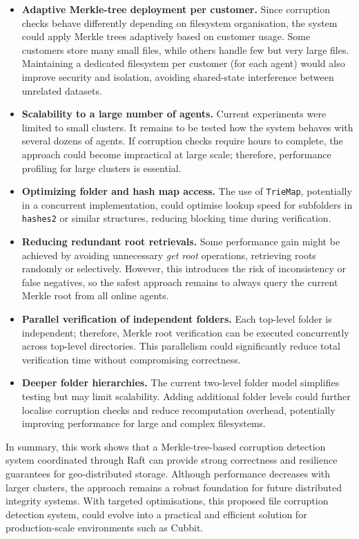 \begin{itemize}
    \item \textbf{Adaptive Merkle-tree deployment per customer.}
    Since corruption checks behave differently depending on filesystem
    organisation, the system could apply Merkle trees adaptively based on customer usage.
    Some customers store many small files, while others handle few but very large files.
    Maintaining a dedicated filesystem per customer (for each agent) would also improve security and isolation, avoiding shared-state interference between unrelated datasets.

    \item \textbf{Scalability to a large number of agents.}
    Current experiments were limited to small clusters.
    It remains to be tested how the system behaves with several dozens of agents.
    If corruption checks require hours to complete, the approach could become impractical at large scale; therefore, performance profiling for large clusters is essential.

    \item \textbf{Optimizing folder and hash map access.}
    The use of \texttt{TrieMap}, potentially in a concurrent implementation, could optimise lookup speed for subfolders in \texttt{hashes2} or similar structures, reducing blocking time during verification.

    \item \textbf{Reducing redundant root retrievals.}
    Some performance gain might be achieved by avoiding unnecessary \emph{get root} operations, retrieving roots randomly or selectively.
    However, this introduces the risk of inconsistency or false negatives, so the safest approach remains to always query the current Merkle root from all online agents.

    \item \textbf{Parallel verification of independent folders.}
    Each top-level folder is independent; therefore, Merkle root verification can be executed concurrently across top-level directories.
    This parallelism could significantly reduce total verification time without compromising correctness.

    \item \textbf{Deeper folder hierarchies.}
    The current two-level folder model simplifies testing but may limit scalability.
    Adding additional folder levels could further localise corruption checks and reduce recomputation overhead, potentially improving performance for large and complex filesystems.
\end{itemize}

In summary, this work shows that a Merkle-tree-based corruption detection system coordinated through Raft can provide strong correctness and resilience guarantees for geo-distributed storage.
Although performance decreases with larger clusters, the approach remains a robust foundation for future distributed integrity systems.
With targeted optimisations, this proposed file corruption detection system, could evolve into a practical and efficient solution for production-scale environments such as Cubbit.
